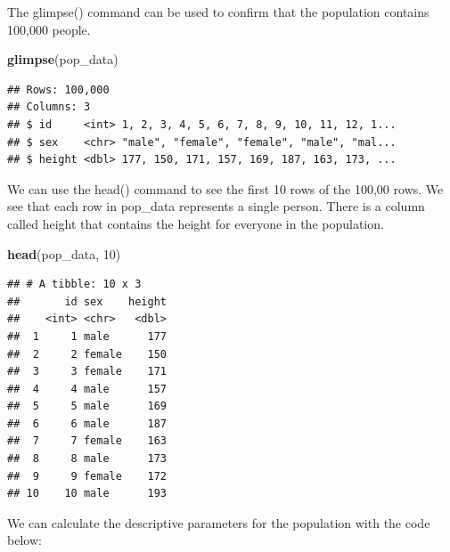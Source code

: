 \documentclass[
]{krantz}
\makeatletter
\newenvironment{Shaded}{\begin{snugshade}}{\end{snugshade}}
\newcommand{\DataTypeTok}[1]{\textcolor[rgb]{0.27,0.27,0.27}{#1}}
\newcommand{\DecValTok}[1]{\textcolor[rgb]{0.06,0.06,0.06}{#1}}
\newcommand{\KeywordTok}[1]{\textcolor[rgb]{0.27,0.27,0.27}{\textbf{#1}}}
\newcommand{\NormalTok}[1]{#1}
\newcommand{\OperatorTok}[1]{\textcolor[rgb]{0.43,0.43,0.43}{\textbf{#1}}}
\newcommand{\StringTok}[1]{\textcolor[rgb]{0.5,0.5,0.5}{#1}}
\newenvironment{kframe}{%
\medskip{}
\setlength{\fboxsep}{.8em}
 \def\at@end@of@kframe{}%
 \ifinner\ifhmode%
  \def\at@end@of@kframe{\end{minipage}}%
  \begin{minipage}{\columnwidth}%
 \fi\fi%
 \def\FrameCommand##1{\hskip\@totalleftmargin \hskip-\fboxsep
 \colorbox{shadecolor}{##1}\hskip-\fboxsep
     \hskip-\linewidth \hskip-\@totalleftmargin \hskip\columnwidth}%
 \MakeFramed {\advance\hsize-\width
   \@totalleftmargin\z@ \linewidth\hsize
   \@setminipage}}%
 {\par\unskip\endMakeFramed%
 \at@end@of@kframe}
\renewenvironment{Shaded}{\begin{kframe}}{\end{kframe}}
\makeatother
\begin{document}
The glimpse() command can be used to confirm that the population contains 100,000 people.

\begin{Shaded}
\begin{Highlighting}[]
\KeywordTok{glimpse}\NormalTok{(pop_data)}
\end{Highlighting}
\end{Shaded}

\begin{verbatim}
## Rows: 100,000
## Columns: 3
## $ id     <int> 1, 2, 3, 4, 5, 6, 7, 8, 9, 10, 11, 12, 1...
## $ sex    <chr> "male", "female", "female", "male", "mal...
## $ height <dbl> 177, 150, 171, 157, 169, 187, 163, 173, ...
\end{verbatim}

We can use the head() command to see the first 10 rows of the 100,00 rows. We see that each row in pop\_data represents a single person. There is a column called height that contains the height for everyone in the population.

\begin{Shaded}
\begin{Highlighting}[]
\KeywordTok{head}\NormalTok{(pop_data, }\DecValTok{10}\NormalTok{)}
\end{Highlighting}
\end{Shaded}

\begin{verbatim}
## # A tibble: 10 x 3
##       id sex    height
##    <int> <chr>   <dbl>
##  1     1 male      177
##  2     2 female    150
##  3     3 female    171
##  4     4 male      157
##  5     5 male      169
##  6     6 male      187
##  7     7 female    163
##  8     8 male      173
##  9     9 female    172
## 10    10 male      193
\end{verbatim}

We can calculate the descriptive parameters for the population with the code below:

\begin{Shaded}
\end{Shaded}
\end{document}
